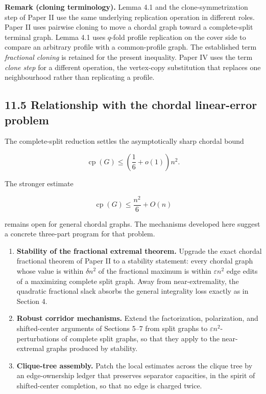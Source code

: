 \documentclass[
  11pt,
]{article}
\begin{document}
\textbf{Remark (cloning terminology).} Lemma 4.1 and the clone-symmetrization step of Paper II use the same underlying replication operation in different roles. Paper II uses pairwise cloning to move a chordal graph toward a complete-split terminal graph. Lemma 4.1 uses \(q\)-fold profile replication on the cover side to compare an arbitrary profile with a common-profile graph. The established term \emph{fractional cloning} is retained for the present inequality. Paper IV uses the term \emph{clone step} for a different operation, the vertex-copy substitution that replaces one neighbourhood rather than replicating a profile.

\subsection{11.5 Relationship with the chordal linear-error problem}\label{relationship-with-the-chordal-linear-error-problem}

The complete-split reduction settles the asymptotically sharp chordal bound

\[
\operatorname{cp}(G)
\le
\left(\frac16+o(1)\right)n^2.
\]

The stronger estimate

\[
\operatorname{cp}(G)
\le
\frac{n^2}{6}+O(n)
\]

remains open for general chordal graphs. The mechanisms developed here suggest a concrete three-part program for that problem.

\begin{enumerate}
\def\labelenumi{\arabic{enumi}.}
\item
  \textbf{Stability of the fractional extremal theorem.} Upgrade the exact chordal fractional theorem of Paper II to a stability statement: every chordal graph whose value is within \(\delta n^2\) of the fractional maximum is within \(\varepsilon n^2\) edge edits of a maximizing complete split graph. Away from near-extremality, the quadratic fractional slack absorbs the general integrality loss exactly as in Section 4.
\item
  \textbf{Robust corridor mechanisms.} Extend the factorization, polarization, and shifted-center arguments of Sections 5--7 from split graphs to \(\varepsilon n^2\)-perturbations of complete split graphs, so that they apply to the near-extremal graphs produced by stability.
\item
  \textbf{Clique-tree assembly.} Patch the local estimates across the clique tree by an edge-ownership ledger that preserves separator capacities, in the spirit of shifted-center completion, so that no edge is charged twice.
\end{enumerate}
\end{document}
